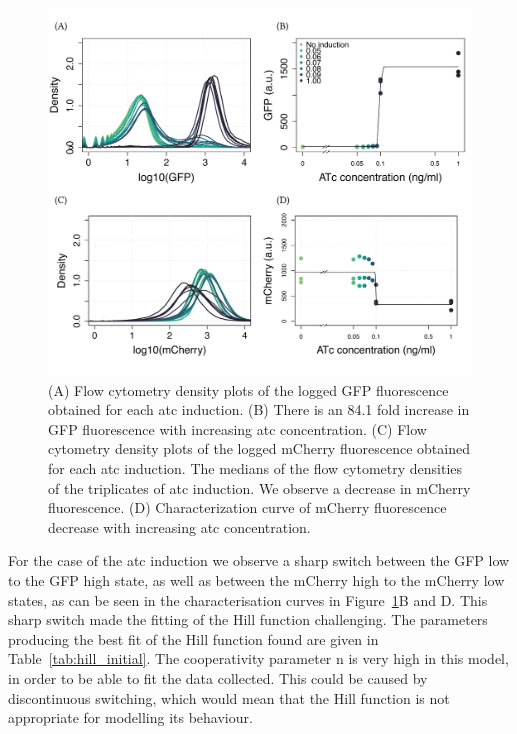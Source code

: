 \begin{figure}[tb]
	\begin{center}
\includegraphics[width=\textwidth]{../../chapters/chapterABCFlow/images/pKDL071_concentrations_ATc-01.png}
\caption[Characterisation of pKDL071 after \acrshort{atc} induction]{\label{fig:switch_concentrations_model_atc} (A) Flow cytometry density plots of the logged GFP fluorescence obtained for each \acrshort{atc} induction. (B) There is an 84.1 fold increase in GFP fluorescence with increasing \acrshort{atc} concentration. (C) Flow cytometry density plots of the logged mCherry fluorescence obtained for each \acrshort{atc} induction. The medians of the flow cytometry densities of the triplicates of \acrshort{atc} induction. We observe a decrease in mCherry fluorescence. (D) Characterization curve of mCherry fluorescence decrease with increasing \acrshort{atc} concentration.}
\end{center}
\end{figure}

For the case of the \acrshort{atc} induction we observe a sharp switch between the GFP low to the GFP high state, as well as between the mCherry high to the mCherry low states, as can be seen in the characterisation curves in Figure~\ref{fig:switch_concentrations_model_atc}B and D. This sharp switch made the fitting of the Hill function challenging. The parameters producing the best fit of the Hill function found are given in Table~\ref{tab:hill_initial}. The cooperativity parameter n is very high in this model, in order to be able to fit the data collected. This could be caused by discontinuous switching, which would mean that the Hill function is not appropriate for modelling its behaviour. 

